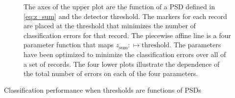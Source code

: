 \documentclass[12pt]{article}
\begin{document}
\begin{figure}
  \centering
  \caption[A function of PSDs for varying detector thresholds.]{The
    axes of the upper plot are the function of a PSD defined in
    \eqref{eq:z_sum} and the detector threshold.  The markers for each
    record are placed at the threshold that minimizes the number of
    classification errors for that record.  The piecewise affine line
    is a four parameter function that maps
    $z_{\text{sum}}: \mapsto \text{threshold}$.  The parameters have
    been optimized to minimize the classification errors over all of a
    set of records.  The four lower plots illustrate the dependence of
    the total number of errors on each of the four parameters.  }
  \label{fig:shift_threshold}
\end{figure}

\begin{table*}
  \centering
  
  \caption[Performance]{Classification performance when thresholds are
  functions of PSDs}
  \label{tab:abcd_score}
\end{table*}
\end{document}
